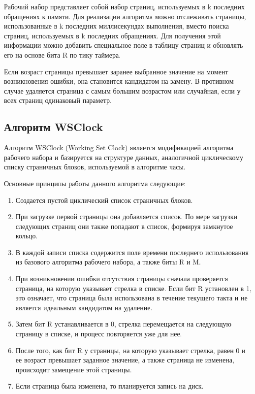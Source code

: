 Рабочий набор представляет собой набор страниц, используемых в k последних обращениях к памяти. 
Для реализации алгоритма можно отслеживать страницы, использованные в k последних миллисекундах выполнения, вместо поиска страниц, используемых в k последних обращениях.
Для получения этой информации можно добавить специальное поле в таблицу страниц и обновлять его на основе бита R по тику таймера.

Если возраст страницы превышает заранее выбранное значение на момент возникновения ошибки, она становится кандидатом на замену. 
В противном случае удаляется страница с самым большим возрастом или случайная, если у всех страниц одинаковый параметр.

\subsection{Алгоритм WSClock}

Алгоритм WSClock (Working Set Clock) является модификацией алгоритма рабочего набора и базируется на структуре данных, аналогичной циклическому списку страничных блоков, используемой в алгоритме часы.

Основные принципы работы данного алгоритма следующие:
\begin{enumerate}
	\item Создается пустой циклический список страничных блоков.
	\item При загрузке первой страницы она добавляется список. По мере загрузки следующих страниц они также попадают в список, формируя замкнутое кольцо.
	\item В каждой записи списка содержится поле времени последнего использования из базового алгоритма рабочего набора, а также биты R и M.
	\item При возникновении ошибки отсутствия страницы сначала проверяется	страница, на которую указывает стрелка в списке. Если бит R установлен в 1, это означает, что страница была использована в течение	текущего такта и не является идеальным кандидатом на удаление.
	\item Затем бит R устанавливается в 0, стрелка перемещается на следующую страницу в списке, и процесс повторяется уже для нее.
	\item После того, как бит R у страницы, на которую указывает стрелка, 	равен 0 и ее возраст превышает заданное значение, а также страница не изменена, происходит замещение этой страницы.
	\item Если страница была изменена, то планируется запись на диск.
\end{enumerate}

